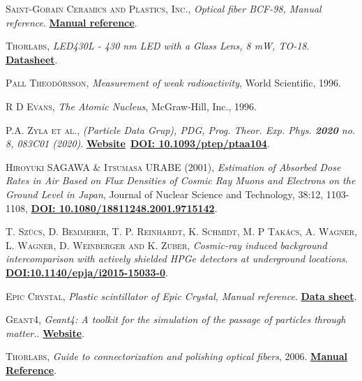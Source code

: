 \begin{thebibliography}{100}
 \textsc{Saint-Gobain Ceramics and Plastics, Inc.},
\textit{Optical fiber BCF-98, Manual reference}. \href{https://www.crystals.saint-gobain.com/products/scintillating-fiber}{\textbf{Manual reference}}.

 \textsc{Thorlabs},
\textit{LED430L - 430 nm LED with a Glass Lens, 8 mW, TO-18}. \href{https://www.thorlabs.com/thorproduct.cfm?partnumber=LED430L}{\textbf{Datasheet}}.

 \textsc{Pall Theodórsson},
\textit{Measurement of weak radioactivity}, World Scientific, 1996.

 \textsc{R D Evans},
\textit{The Atomic Nucleus}, McGraw-Hill, Inc., 1996.

 \textsc{P.A. Zyla et al.},
\textit{(Particle Data Grup), PDG, Prog. Theor. Exp. Phys. \textbf{2020} no. 8, 083C01 (2020)}. \href{https://pdg.lbl.gov/}{\textbf{Website}}~\href{https://academic.oup.com/ptep/article/2020/8/083C01/5891211}{\textbf{DOI: 10.1093/ptep/ptaa104}}.

 \textsc{Hiroyuki SAGAWA \& Itsumasa URABE (2001)},
\textit{Estimation of Absorbed Dose Rates in Air Based on Flux Densities of Cosmic Ray Muons and Electrons on the Ground Level in Japan}, Journal of Nuclear Science and Technology, 38:12, 1103-1108, \href{https://doi.org/10.1080/18811248.2001.9715142}{\textbf{DOI: 10.1080/18811248.2001.9715142}}.

 \textsc{T. Szücs, D. Bemmerer, T. P. Reinhardt, K. Schmidt, M. P Takács, A. Wagner, L. Wagner, D. Weinberger and K. Zuber},
\textit{Cosmic-ray induced background intercomparison with actively shielded HPGe detectors at underground locations}. \href{https://arxiv.org/abs/1503.00457v2}{\textbf{DOI:10.1140/epja/i2015-15033-0}}.

 \textsc{Epic Crystal},
\textit{Plastic scintillator of Epic Crystal, Manual reference}. \href{http://www.epic-crystal.com/others/plastic-scintillator.html}{\textbf{Data sheet}}.

 \textsc{Geant4},
\textit{Geant4: A toolkit for the simulation of the passage of particles through matter.}. \href{https://geant4.web.cern.ch/node/1}{\textbf{Website}}.

 \textsc{Thorlabs},
\textit{Guide to connectorization and polishing optical fibers}, 2006. \href{https://www.thorlabs.de/thorproduct.cfm?partnumber=FN96A}{\textbf{Manual Reference}}.


\end{thebibliography}
